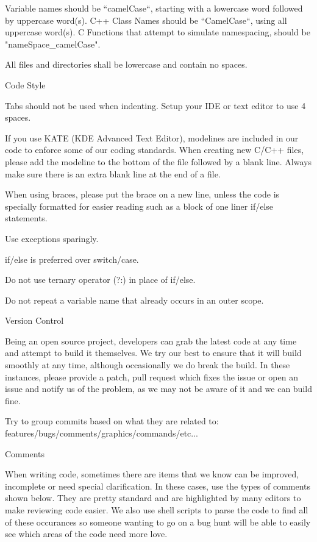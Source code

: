 \documentclass[a4paper]{report}
\begin{document}
Variable names should be ``camelCase``, starting with a lowercase word followed by uppercase word(s).
C++ Class Names should be ``CamelCase``, using all uppercase word(s).
C Functions that attempt to simulate namespacing, should be "nameSpace\_camelCase".

All files and directories shall be lowercase and contain no spaces.

Code Style
~~~~~~~~~~

Tabs should not be used when indenting. Setup your IDE or text editor to use 4 spaces.

If you use KATE (KDE Advanced Text Editor), modelines are included in our code to enforce 
some of our coding standards. When creating new C/C++ files, please add
the modeline to the bottom of the file followed by a blank line. Always make sure there
is an extra blank line at the end of a file.

When using braces, please put the brace on a new line, unless the code is specially formatted
for easier reading such as a block of one liner if/else statements.

Use exceptions sparingly.

if/else is preferred over switch/case.

Do not use ternary operator (?:) in place of if/else.

Do not repeat a variable name that already occurs in an outer scope.

Version Control 
~~~~~~~~~~~~~~~

Being an open source project, developers can grab the latest code at any time
and attempt to build it themselves. We try our best to ensure that it will build smoothly
at any time, although occasionally we do break the build. In these instances,
please provide a patch, pull request which fixes the issue or open an issue and
notify us of the problem, as we may not be aware of it and we can build fine.

Try to group commits based on what they are related to: features/bugs/comments/graphics/commands/etc...

Comments
~~~~~~~~

When writing code, sometimes there are items that we know can be improved,
incomplete or need special clarification. In these cases, use the types of
comments shown below. They are pretty standard and are highlighted by many editors to
make reviewing code easier. We also use shell scripts to parse the code to find
all of these occurances so someone wanting to go on a bug hunt will be able to
easily see which areas of the code need more love.
\end{document}
